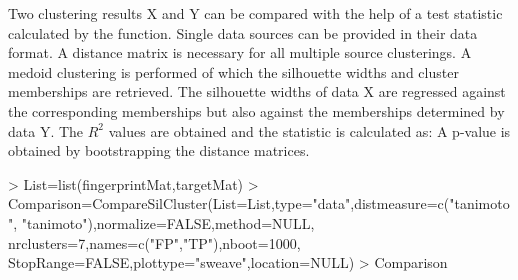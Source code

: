 \documentclass[a4paper]{article}
\begin{document}
\newpage
\noindent Two clustering results X and Y can be compared with the help of a test
statistic calculated by the  function. Single data
sources can be provided in their data format. A distance matrix is necessary for
all multiple source clusterings. A medoid clustering is performed of which the
silhouette widths and cluster memberships are retrieved. The silhouette widths
of data X are regressed against the corresponding memberships but also against
the memberships determined by data Y. The $R^{2}$ values are obtained and the
statistic is calculated as:
A p-value is obtained by bootstrapping the distance matrices.
\begin{Schunk}
\begin{Sinput}
> List=list(fingerprintMat,targetMat)
> Comparison=CompareSilCluster(List=List,type="data",distmeasure=c("tanimoto",
                              "tanimoto"),normalize=FALSE,method=NULL,
 		                      nrclusters=7,names=c("FP","TP"),nboot=1000,
                               StopRange=FALSE,plottype="sweave",location=NULL)
> Comparison
\end{Sinput}
\end{Schunk}
\end{document}
